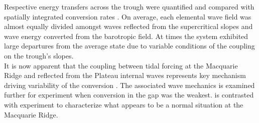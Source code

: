 \documentclass[12pt]{article}
\begin{document}
Respective energy transfers across the trough were quantified and compared with spatially 
integrated conversion rates . On average, each elemental wave field 
was almost equally divided amongst waves reflected from the supercritical slopes and wave energy 
converted from the barotropic field. At times the system exhibited large departures from the 
average state due to variable conditions of the coupling on the trough's slopes.\\

It is now apparent that the coupling between tidal forcing at the Macquarie Ridge and reflected 
from the Plateau internal waves represents key mechanism driving variability of the 
conversion . The associated wave mechanics is examined further for 
experiment  when conversion in the gap was the weakest.  is contrasted with 
experiment  to characterize what appears to be a normal situation at the Macquarie 
Ridge.

%

\end{document}

